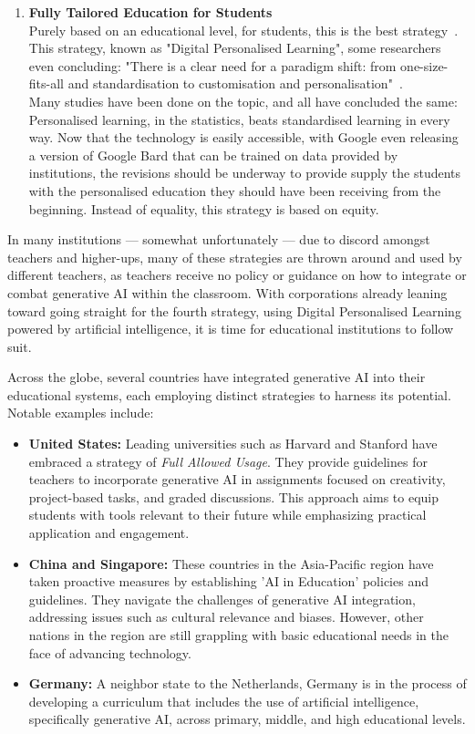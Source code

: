\documentclass[a4paper,12pt]{report}
\begin{document}
\begin{enumerate}
    \item{\textbf{Fully Tailored Education for Students}}\\
    Purely based on an educational level, for students, this is the best strategy~\cite{DPL}. This strategy, known as "Digital Personalised Learning", some researchers even concluding: "There is a clear need for a paradigm shift: from one-size-fits-all and standardisation to customisation and personalisation"~\cite{ALT}.\\
    Many studies have been done on the topic, and all have concluded the same: Personalised learning, in the statistics, beats standardised learning in every way. Now that the technology is easily accessible, with Google even releasing a version of Google Bard that can be trained on data provided by institutions, the revisions should be underway to provide supply the students with the personalised education they should have been receiving from the beginning. Instead of equality, this strategy is based on equity.
\end{enumerate}
In many institutions --- somewhat unfortunately --- due to discord amongst teachers and higher-ups, many of these strategies are thrown around and used by different teachers, as teachers receive no policy or guidance on how to integrate or combat generative AI within the classroom. With corporations already leaning toward going straight for the fourth strategy, using Digital Personalised Learning powered by artificial intelligence, it is time for educational institutions to follow suit.

Across the globe, several countries have integrated generative AI into their educational systems, each employing distinct strategies to harness its potential. Notable examples include:
\begin{itemize}
    \item{\textbf{United States:}} Leading universities such as Harvard and Stanford have embraced a strategy of \textit{Full Allowed Usage}. They provide guidelines for teachers to incorporate generative AI in assignments focused on creativity, project-based tasks, and graded discussions. This approach aims to equip students with tools relevant to their future while emphasizing practical application and engagement.
    
    \item{\textbf{China and Singapore:}} These countries in the Asia-Pacific region have taken proactive measures by establishing 'AI in Education' policies and guidelines. They navigate the challenges of generative AI integration, addressing issues such as cultural relevance and biases. However, other nations in the region are still grappling with basic educational needs in the face of advancing technology.
    
    \item{\textbf{Germany:}} A neighbor state to the Netherlands, Germany is in the process of developing a curriculum that includes the use of artificial intelligence, specifically generative AI, across primary, middle, and high educational levels.
\end{itemize}
\end{document}
